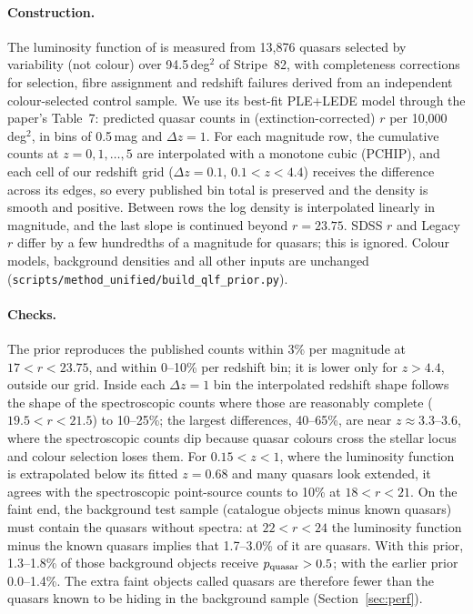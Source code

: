 \documentclass[11pt,a4paper]{article}
\newcommand{\code}[1]{\texttt{#1}}
\begin{document}
\paragraph{Construction.} The luminosity function of \citet{PalanqueDelabrouille2016} is measured from 13,876
quasars selected by variability (not colour) over 94.5\,deg$^2$ of Stripe~82, with completeness corrections for
selection, fibre assignment and redshift failures derived from an independent colour-selected control sample. We
use its best-fit PLE+LEDE model through the paper's Table~7: predicted quasar counts in (extinction-corrected)
$r$ per 10,000\,deg$^2$, in bins of 0.5\,mag and $\Delta z=1$. For each magnitude row, the cumulative counts at
$z=0,1,\dots,5$ are interpolated with a monotone cubic (PCHIP), and each cell of our redshift grid ($\Delta z=0.1$,
$0.1<z<4.4$) receives the difference across its edges, so every published bin total is preserved and the density
is smooth and positive. Between rows the log density is interpolated linearly in magnitude, and the last slope is
continued beyond $r=23.75$. SDSS $r$ and Legacy $r$ differ by a few hundredths of a magnitude for quasars; this is
ignored. Colour models, background densities and all other inputs are unchanged
(\code{scripts/method\_unified/build\_qlf\_prior.py}).

\paragraph{Checks.} The prior reproduces the published counts within 3\% per magnitude at $17<r<23.75$, and within
0--10\% per redshift bin; it is lower only for $z>4.4$, outside our grid. Inside each $\Delta z=1$ bin the
interpolated redshift shape follows the shape of the spectroscopic counts where those are reasonably complete
($19.5<r<21.5$) to 10--25\%; the largest differences, 40--65\%, are near $z\approx3.3$--3.6, where the spectroscopic
counts dip because quasar colours cross the stellar locus and colour selection loses them. For $0.15<z<1$, where the
luminosity function is extrapolated below its fitted $z=0.68$ and many quasars look extended, it agrees with the
spectroscopic point-source counts to 10\% at $18<r<21$. On the faint end, the background test sample (catalogue
objects minus known quasars) must contain the quasars without spectra: at $22<r<24$ the luminosity function minus
the known quasars implies that 1.7--3.0\% of it are quasars. With this prior, 1.3--1.8\% of those background objects
receive $p_{\rm quasar}>0.5$; with the earlier prior 0.0--1.4\%. The extra faint objects called quasars are therefore
fewer than the quasars known to be hiding in the background sample (Section~\ref{sec:perf}).
\end{document}
